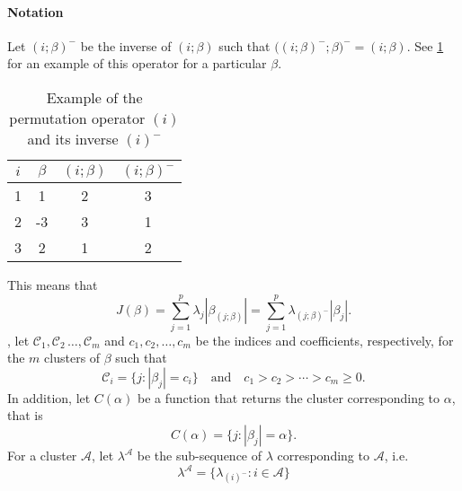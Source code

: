 \paragraph{Notation}\label{sec:notation}

Let \((i;\beta)^{-}\) be the inverse of \((i;\beta)\) such that
\(\big((i;\beta)^-;\beta\big)^- = (i;\beta)\). See \cref{tab:permutation-example} for an
example of this operator for a particular \(\beta\).
\begin{table}
  \centering
  \caption{Example of the permutation operator \((i)\) and its inverse
    \((i)^-\)\label{tab:permutation-example}}
  \begin{tabular}{cccc}
    \toprule
    \(i\) & \(\beta\) & \((i; \beta)\) & \((i; \beta)^-\) \\
    \midrule
    1     & 1         & 2              & 3                \\
    2     & -3        & 3              & 1                \\
    3     & 2         & 1              & 2                \\
    \bottomrule
  \end{tabular}
\end{table}
This means that
\[
  J(\beta) = \sum_{j=1}^p \lambda_j |\beta_{(j;\beta)}|
  = \sum_{j=1}^p \lambda_{(j;\beta)^-}|\beta_j|.
\]
, let \(\mathcal{C}_1, \mathcal{C}_2\, \dots, \mathcal{C}_m\) and \(c_1,
c_2, \dots, c_m\) be the indices and coefficients, respectively, for the \(m\)
clusters of $\beta$ such that
\[
  \mathcal{C}_i = \{j : |\beta_j| = c_i\} \quad \text{and} \quad
  c_1 > c_2 > \cdots > c_m \geq 0.
\]
In addition, let \(C(\alpha)\) be a function that returns the
cluster corresponding to \(\alpha\), that is
\[
  C(\alpha) = \{j : |\beta_j| = \alpha\}.
\]
For a cluster $\mathcal{A}$, let \(\lambda^{\mathcal{A}}\) be the sub-sequence of
\(\lambda\) corresponding to \(\mathcal{A}\), i.e.
\[
  \lambda^\mathcal{A} = \{\lambda_{(i)^-} : i \in \mathcal{A}\}
\]




